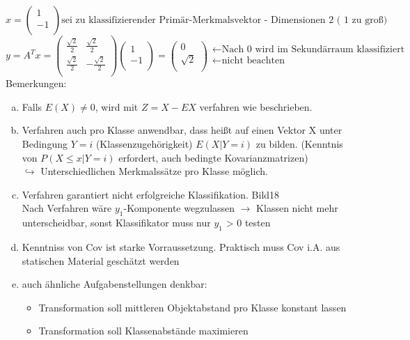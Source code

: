 \documentclass[a4paper,12pt]{scrreprt}
\begin{document}
$$x = \begin{pmatrix}
      1 \\ -1\\
    \end{pmatrix} \text{sei zu klassifizierender Primär-Merkmalsvektor - Dimensionen 2 ( 1 zu groß)}
$$
$$ y = A^Tx = \begin{pmatrix}
          \frac{\sqrt{2}}{2} &  \frac{\sqrt{2}}{2}\\
           \frac{\sqrt{2}}{2} &  -\frac{\sqrt{2}}{2}\\
       \end{pmatrix} \begin{pmatrix}
      1 \\ -1\\
    \end{pmatrix} = \begin{pmatrix}
     0 \\ \sqrt{2}\\
    \end{pmatrix}
    \begin{array}{ l }
     \leftarrow \text{Nach 0 wird im Sekundärraum klassifiziert}\\
     \leftarrow \text{nicht beachten}\\
    \end{array}$$        
Bemerkungen:
\begin{enumerate}[a)]
\item Falls $E(X)\not =0$, wird mit $Z=X-EX$ verfahren wie beschrieben.
\item Verfahren auch pro Klasse anwendbar, dass heißt auf einen Vektor X unter Bedingung $Y=i$ (Klassenzugehörigkeit) $E(X|Y=i)$ zu bilden. (Kenntnis von $P(X\leq x | Y=i)$ erfordert, auch bedingte Kovarianzmatrizen)\\
$\hookrightarrow$ Unterschiedlichen Merkmalssätze pro Klasse möglich.
\item Verfahren garantiert nicht erfolgreiche Klassifikation. Bild18\\
Nach Verfahren wäre $y_1$-Komponente wegzulassen $\rightarrow$ Klassen nicht mehr unterscheidbar, sonst Klassifikator muss nur $y_1$ > 0 testen
\item Kenntniss von Cov ist starke Vorraussetzung. Praktisch muss Cov i.A. aus statischen Material geschätzt werden
\item auch ähnliche Aufgabenstellungen denkbar:
\begin{itemize}
 \item Transformation soll mittleren Objektabstand pro Klasse konstant lassen
 \item Transformation soll Klassenabstände maximieren
\end{itemize}

\end{enumerate}
\end{document}
